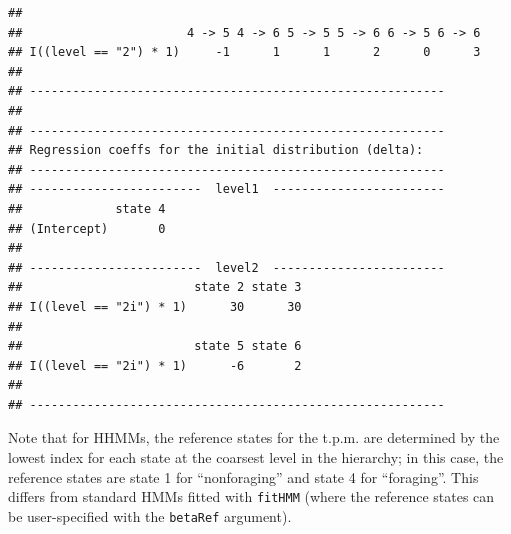 \documentclass[12pt]{article}\usepackage[]{graphicx}\usepackage[]{color}
\makeatletter
\newenvironment{kframe}{%
 \def\at@end@of@kframe{}%
 \ifinner\ifhmode%
  \def\at@end@of@kframe{\end{minipage}}%
  \begin{minipage}{\columnwidth}%
 \fi\fi%
 \def\FrameCommand##1{\hskip\@totalleftmargin \hskip-\fboxsep
 \colorbox{shadecolor}{##1}\hskip-\fboxsep
     \hskip-\linewidth \hskip-\@totalleftmargin \hskip\columnwidth}%
 \MakeFramed {\advance\hsize-\width
   \@totalleftmargin\z@ \linewidth\hsize
   \@setminipage}}%
 {\par\unskip\endMakeFramed%
 \at@end@of@kframe}
\newenvironment{knitrout}{}{} %
\makeatother
\begin{document}
\begin{knitrout}
\begin{kframe}
\begin{verbatim}
## 
##                       4 -> 5 4 -> 6 5 -> 5 5 -> 6 6 -> 5 6 -> 6
## I((level == "2") * 1)     -1      1      1      2      0      3
## 
## ----------------------------------------------------------
## 
## ----------------------------------------------------------
## Regression coeffs for the initial distribution (delta):
## ----------------------------------------------------------
## ------------------------  level1  ------------------------
##             state 4
## (Intercept)       0
## 
## ------------------------  level2  ------------------------
##                        state 2 state 3
## I((level == "2i") * 1)      30      30
## 
##                        state 5 state 6
## I((level == "2i") * 1)      -6       2
## 
## ----------------------------------------------------------
\end{verbatim}
\end{kframe}
\end{knitrout}
\noindent Note that for HHMMs, the reference states for the t.p.m. are determined by the lowest index for each state at the coarsest level in the hierarchy; in this case, the reference states are state 1 for ``nonforaging'' and state 4 for ``foraging''. This differs from standard HMMs fitted with \verb|fitHMM| (where the reference states can be user-specified with the \verb|betaRef| argument).  
\end{document}
